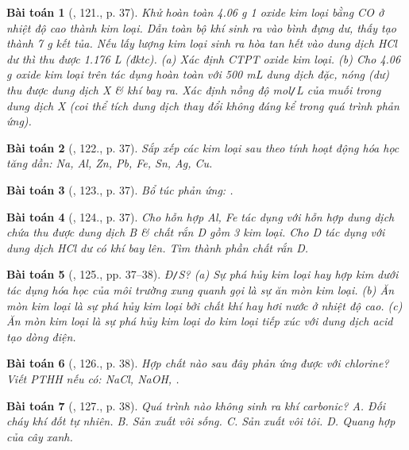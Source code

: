 \documentclass{article}
\newtheorem{baitoan}{Bài toán}
\begin{document}
\begin{baitoan}[\cite{An_400_BT_Hoa_Hoc_9}, 121., p. 37]
	Khử hoàn toàn {\rm4.06 g} 1 oxide kim loại bằng {\rm CO} ở nhiệt độ cao thành kim loại. Dẫn toàn bộ khí sinh ra vào bình đựng {\rm{}} dư, thấy tạo thành {\rm7 g} kết tủa. Nếu lấy lượng kim loại sinh ra hòa tan hết vào dung dịch {\rm HCl} dư thì thu được {\rm1.176 L } (đktc). (a) Xác định {\rm CTPT} oxide kim loại. (b) Cho {\rm4.06 g} oxide kim loại trên tác dụng hoàn toàn với {\rm500 mL} dung dịch {\rm{}} đặc, nóng (dư) thu được dung dịch X \& khí {\rm{}} bay ra. Xác định nồng độ {\rm mol{\tt/}L} của muối trong dung dịch X (coi thể tích dung dịch thay đổi không đáng kể trong quá trình phản ứng).
\end{baitoan}

\begin{baitoan}[\cite{An_400_BT_Hoa_Hoc_9}, 122., p. 37]
	Sắp xếp các kim loại sau theo tính hoạt động hóa học tăng dần: {\rm Na, Al, Zn, Pb, Fe, Sn, Ag, Cu}.
\end{baitoan}

\begin{baitoan}[\cite{An_400_BT_Hoa_Hoc_9}, 123., p. 37]
	Bổ túc phản ứng: {\rm{}}.
\end{baitoan}

\begin{baitoan}[\cite{An_400_BT_Hoa_Hoc_9}, 124., p. 37]
	Cho hỗn hợp {\rm Al, Fe} tác dụng với hỗn hợp dung dịch chứa {\rm{}} thu được dung dịch B \& chất rắn D gồm 3 kim loại. Cho D tác dụng với dung dịch {\rm HCl} dư có khí bay lên. Tìm thành phần chất rắn D.
\end{baitoan}

\begin{baitoan}[\cite{An_400_BT_Hoa_Hoc_9}, 125., pp. 37--38]
	{\rm Đ{\tt/}S?} (a) Sự phá hủy kim loại hay hợp kim dưới tác dụng hóa học của môi trường xung quanh gọi là {\rm sự ăn mòn kim loại}. (b) Ăn mòn kim loại là sự phá hủy kim loại bởi chất khí hay hơi nước ở nhiệt độ cao. (c) Ăn mòn kim loại là sự phá hủy kim loại do kim loại tiếp xúc với dung dịch acid tạo dòng điện.
\end{baitoan}

\begin{baitoan}[\cite{An_400_BT_Hoa_Hoc_9}, 126., p. 38]
	Hợp chất nào sau đây phản ứng được với chlorine? Viết {\rm PTHH} nếu có: {\rm NaCl, NaOH, }.
\end{baitoan}

\begin{baitoan}[\cite{An_400_BT_Hoa_Hoc_9}, 127., p. 38]
	Quá trình nào không sinh ra khí carbonic? {\sf A.} Đối cháy khí đốt tự nhiên. {\sf B.} Sản xuất vôi sống. {\sf C.} Sản xuất vôi tôi. {\sf D.} Quang hợp của cây xanh.
\end{baitoan}
\end{document}
